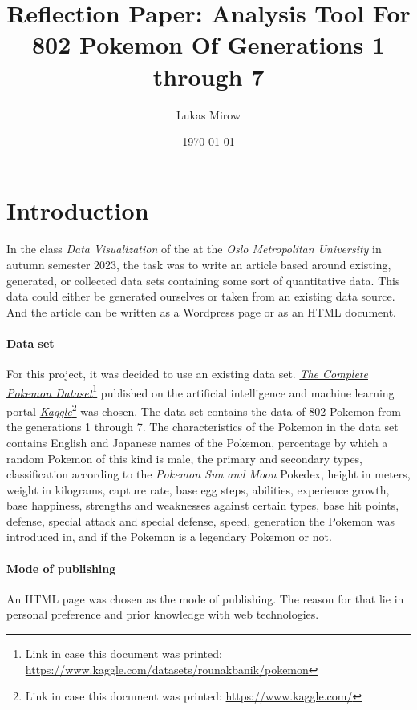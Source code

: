 \documentclass[12pt, a4paper]{article}
\title{Reflection Paper: Analysis Tool For 802 Pokemon Of Generations 1 through 7}
\author{Lukas Mirow}
\date{\today}
\begin{document}
	\maketitle
	\tableofcontents
	\newpage

	\section{Introduction}\label{sec:intro}
		\paragraph{}
			In the class \textit{Data Visualization} of the at the \textit{Oslo Metropolitan University} in autumn semester 2023, the task was to write an article based around existing, generated, or collected data sets containing some sort of quantitative data. This data could either be generated ourselves or taken from an existing data source. And the article can be written as a Wordpress page or as an HTML document.
		\paragraph{Data set}
			For this project, it was decided to use an existing data set. \href{https://www.kaggle.com/datasets/rounakbanik/pokemon}{\textit{The Complete Pokemon Dataset}}\footnote{Link in case this document was printed:\\\href{https://www.kaggle.com/datasets/rounakbanik/pokemon}{https://www.kaggle.com/datasets/rounakbanik/pokemon}} published on the artificial intelligence and machine learning portal \href{https://www.kaggle.com/}{\textit{Kaggle}}\footnote{Link in case this document was printed: \href{https://www.kaggle.com/}{https://www.kaggle.com/}} was chosen. The data set contains the data of 802 Pokemon from the generations 1 through 7. The characteristics of the Pokemon in the data set contains English and Japanese names of the Pokemon, percentage by which a random Pokemon of this kind is male, the primary and secondary types, classification according to the \textit{Pokemon Sun and Moon} Pokedex, height in meters, weight in kilograms, capture rate, base egg steps,  abilities, experience growth, base happiness, strengths and weaknesses against certain types, base hit points, defense, special attack and special defense, speed, generation the Pokemon was introduced in, and if the Pokemon is a legendary Pokemon or not.
		\paragraph{Mode of publishing}
			An HTML page was chosen as the mode of publishing. The reason for that lie in personal preference and prior knowledge with web technologies.
\end{document}
